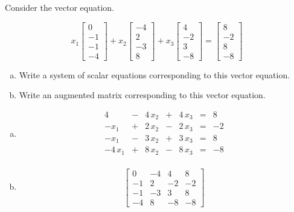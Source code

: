 
\begin{exerciseStatement}


Consider the vector equation.

\[ x_{1} \left[\begin{array}{c}
0 \\
-1 \\
-1 \\
-4
\end{array}\right] + x_{2} \left[\begin{array}{c}
-4 \\
2 \\
-3 \\
8
\end{array}\right] + x_{3} \left[\begin{array}{c}
4 \\
-2 \\
3 \\
-8
\end{array}\right] = \left[\begin{array}{c}
8 \\
-2 \\
8 \\
-8
\end{array}\right] \]
\begin{enumerate}[(a)]
\item  Write a system of scalar equations corresponding to this vector equation. 
\item  Write an augmented matrix corresponding to this vector equation. 
\end{enumerate}
    
\end{exerciseStatement}
    
\begin{exerciseAnswer} 

\begin{enumerate}[(a)]
\item 
\begin{alignat*}{4}  &-& 4 \, x_{2} &+& 4 \, x_{3} &=& 8 \\-x_{1} &+& 2 \, x_{2} &-& 2 \, x_{3} &=& -2 \\-x_{1} &-& 3 \, x_{2} &+& 3 \, x_{3} &=& 8 \\-4 \, x_{1} &+& 8 \, x_{2} &-& 8 \, x_{3} &=& -8 \\ \end{alignat*}
            
\item \[ \left[\begin{array}{ccc|c}
0 & -4 & 4 & 8 \\
-1 & 2 & -2 & -2 \\
-1 & -3 & 3 & 8 \\
-4 & 8 & -8 & -8
\end{array}\right] \]
\end{enumerate}
    
\end{exerciseAnswer}
    

